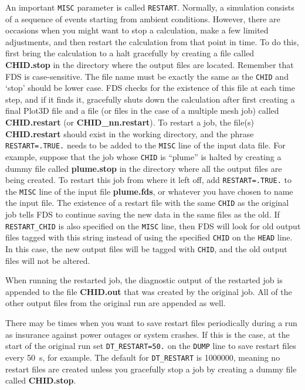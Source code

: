 \documentclass[11pt]{book}
\newcommand{\ct}{\tt\small}
\begin{document}
An important {\ct MISC} parameter is called {\ct RESTART}. Normally, a simulation consists of a sequence of events
starting from ambient conditions. However, there are occasions
when you might want to stop a calculation, make a few
limited adjustments, and then
restart the calculation from that point in time. To do this,
first bring the calculation to a halt gracefully by creating a file
called {\bf CHID.stop}
in the directory where the output files are located. Remember that
FDS is case-sensitive. The file name must be exactly the same as
the {\ct CHID} and `stop' should be lower case. FDS checks for the
existence of this file at each time step, and if it finds it, gracefully
shuts down the calculation after first creating a final Plot3D
file and a file (or files in the case of a multiple mesh job)
called {\bf CHID.restart} (or {\bf CHID\_nn.restart}).
To restart a job, the file(s) {\bf CHID.restart} should exist in
the working directory, and
the phrase {\ct RESTART=.TRUE.} needs to be added
to the {\ct MISC} line of the input data file.
For example, suppose that the job
whose {\ct CHID} is ``plume'' is halted by creating a
dummy file called {\bf plume.stop} in the directory where
all the output files are being created. To restart this job from where it
left off, add {\ct RESTART=.TRUE.} to the {\ct MISC} line
of the input file {\bf plume.fds}, or whatever you have chosen to
name the input file. The existence of a restart file with the same
{\ct CHID} as the original job tells FDS
to continue saving the new data in the same files as the old.  If {\ct RESTART\_CHID} is also specified on the
{\ct MISC} line, then FDS will look for old output files tagged with this string instead of using the specified
{\ct CHID} on the {\ct HEAD} line. In this case, the new output files will be tagged with {\ct CHID}, and the
old output files will not be altered.

When running the restarted job, the diagnostic
output of the restarted job is appended to the file {\bf CHID.out} that was created by
the original job.
All of the other output files from the original run are appended as well.

There may be times when you want to save restart files periodically
during a run as insurance against power outages or system crashes.
If this is the case, at the start of the original run
set {\ct DT\_RESTART=50.} on the {\ct DUMP} line to save restart files
every 50~s, for example.
The default for {\ct DT\_RESTART} is 1000000, meaning no restart files are
created unless you gracefully stop a job by
creating a dummy file called {\bf CHID.stop}.
\end{document}
